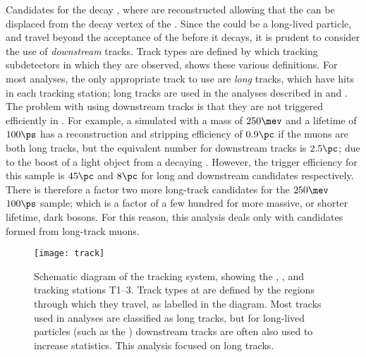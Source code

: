 Candidates for the decay \btokstrdb, where \dbtomumu are reconstructed allowing that the \db can
be displaced from the decay vertex of the \Bd.
Since the \db could be a long-lived particle, and travel beyond the acceptance of the \velo before
it decays, it is prudent to consider the use of \emph{downstream} tracks.
Track types are defined by which tracking subdetectors in which they are observed,
 shows these various definitions.
For most \lhcb analyses, the only appropriate track to use are \emph{long} tracks, which have hits
in each tracking station; long tracks are used in the analyses described in  and
.
The problem with using downstream tracks is that they are not triggered efficiently in \hlttwo.
For example, a simulated \db with a mass of $250\mev$ and a lifetime of $100\ps$ has a
reconstruction and
stripping efficiency of \approx$0.9\pc$ if the muons are both long tracks, but the equivalent
number for downstream tracks is \approx$2.5\pc$; due to the boost of a light object from a decaying
\Bd.
However, the trigger efficiency for this sample is \approx$45\pc$ and $8\pc$ for long and
downstream candidates respectively.
There is therefore a factor two more long-track candidates for the $250\mev$ $100\ps$ sample; which
is a factor of a few hundred for more massive, or shorter lifetime, dark bosons.
For this reason, this analysis deals only with \db candidates formed from long-track muons.

\begin{figure}
  \begin{center}
    \texttt{[image: track]}
    \caption[Track definitions in the LHCb detector]
    {
      Schematic diagram of the \lhcb tracking system, showing the \velo, \ttracker, and tracking
      stations T1--3.
      Track types at \lhcb are defined by the regions through which they travel, as labelled in the
      diagram.
      Most tracks used in analyses are classified as long tracks, but for long-lived particles
      (such as the \KS) downstream tracks are often also used to increase statistics.
      This analysis focused on long tracks.
    }
    \label{fig:db:lldd}
  \end{center}
\end{figure}



